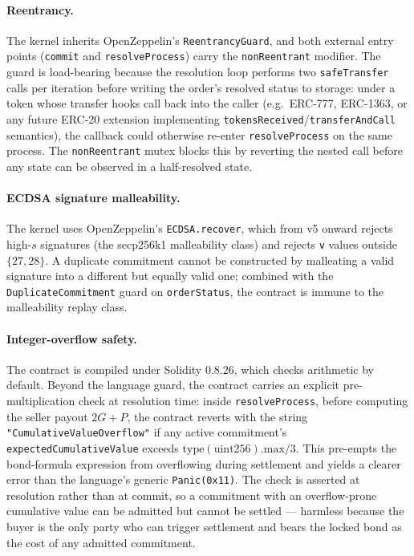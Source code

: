 \documentclass[11pt,a4paper]{article}
\theoremstyle{definition}
\theoremstyle{remark}
\newcommand{\pay}{P}
\newcommand{\cumval}{G}
\begin{document}
\paragraph{Reentrancy.}
The kernel inherits OpenZeppelin's \texttt{ReentrancyGuard}, and both
external entry points (\texttt{commit} and \texttt{resolveProcess})
carry the \texttt{nonReentrant} modifier. The guard is load-bearing
because the resolution loop performs two \texttt{safeTransfer} calls
per iteration before writing the order's resolved status to storage:
under a token whose transfer hooks call back into the caller (e.g.\
ERC-777, ERC-1363, or any future ERC-20 extension implementing
\texttt{tokensReceived}/\texttt{transferAndCall} semantics), the
callback could otherwise re-enter \texttt{resolveProcess} on the same
process. The \texttt{nonReentrant} mutex blocks this by reverting the
nested call before any state can be observed in a half-resolved state.

\paragraph{ECDSA signature malleability.}
The kernel uses OpenZeppelin's \texttt{ECDSA.recover}, which from
v5 onward rejects high-$s$ signatures (the secp256k1 malleability
class) and rejects \texttt{v} values outside $\{27, 28\}$. A duplicate
commitment cannot be constructed by malleating a valid signature into
a different but equally valid one; combined with the
\texttt{DuplicateCommitment} guard on \texttt{orderStatus}, the
contract is immune to the malleability replay class.

\paragraph{Integer-overflow safety.}
The contract is compiled under Solidity 0.8.26, which checks
arithmetic by default. Beyond the language guard, the contract
carries an explicit pre-multiplication check at resolution time:
inside \texttt{resolveProcess}, before computing the seller payout
$2\cumval + \pay$, the contract reverts with the string
\texttt{"CumulativeValueOverflow"} if any active commitment's
\texttt{expectedCumulativeValue} exceeds
$\mathrm{type(uint256).max}/3$. This pre-empts the bond-formula
expression from overflowing during settlement and yields a clearer
error than the language's generic \texttt{Panic(0x11)}. The check
is asserted at resolution rather than at commit, so a commitment
with an overflow-prone cumulative value can be admitted but cannot
be settled --- harmless because the buyer is the only party who can
trigger settlement and bears the locked bond as the cost of any
admitted commitment.
\end{document}
